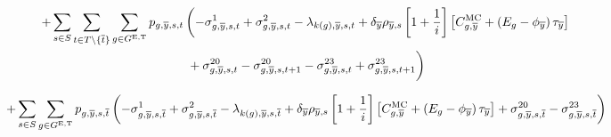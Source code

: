 \documentclass{article}
\begin{document}
\begin{align}
	+ \sum\limits_{\iScenario \in \sScenarios} \sum\limits_{\iInterval \in \sIntervals \setminus \{\iIntervalTerminal\}} \sum\limits_{\iGenerator \in \sGeneratorsExistingThermal} \vPower[\iGenerator,\iYearTerminal,\iScenario,\iInterval] & \left(-\dMinPowerOutput[\iGenerator,\iYearTerminal,\iScenario,\iInterval] + \dMaxPowerOutputExistingThermal[\iGenerator,\iYearTerminal,\iScenario,\iInterval] - \dPowerBalance[k(\iGenerator),\iYearTerminal,\iScenario,\iInterval] + \cDiscountRate[\iYearTerminal] \cScenarioDuration[\iYearTerminal,\iScenario] \left[1 + \frac{1}{\cInterestRate}\right] \left[\cMarginalCost[\iGenerator,\iYearTerminal] + \left(\cEmissionsIntensity - \vBaseline[\iYearTerminal]\right)\vPermitPrice[\iYearTerminal] \right] \right.\nonumber\\
	& \left. \vphantom{1 + \frac{1}{\cInterestRate}} + \dRampRateUp[\iGenerator,\iYearTerminal,\iScenario,\iInterval] - \dRampRateUp[\iGenerator,\iYearTerminal,\iScenario,\iInterval + 1] - \dRampRateDown[\iGenerator,\iYearTerminal,\iScenario,\iInterval] + \dRampRateDown[\iGenerator,\iYearTerminal,\iScenario,\iInterval + 1]
	\right)\nonumber\\
\end{align}

\begin{equation}
	+ \sum\limits_{\iScenario \in \sScenarios} \sum\limits_{\iGenerator \in \sGeneratorsExistingThermal} \vPower[\iGenerator,\iYearTerminal,\iScenario,\iIntervalTerminal] \left(-\dMinPowerOutput[\iGenerator,\iYearTerminal,\iScenario,\iIntervalTerminal] + \dMaxPowerOutputExistingThermal[\iGenerator,\iYearTerminal,\iScenario,\iIntervalTerminal] - \dPowerBalance[k(\iGenerator),\iYearTerminal,\iScenario,\iIntervalTerminal] + \cDiscountRate[\iYearTerminal] \cScenarioDuration[\iYearTerminal,\iScenario] \left[1 + \frac{1}{\cInterestRate}\right] \left[\cMarginalCost[\iGenerator,\iYearTerminal] + \left(\cEmissionsIntensity - \vBaseline[\iYearTerminal]\right)\vPermitPrice[\iYearTerminal] \right] + \dRampRateUp[\iGenerator,\iYearTerminal,\iScenario,\iIntervalTerminal] - \dRampRateDown[\iGenerator,\iYearTerminal,\iScenario,\iIntervalTerminal] \right)
\end{equation}
\end{document}
